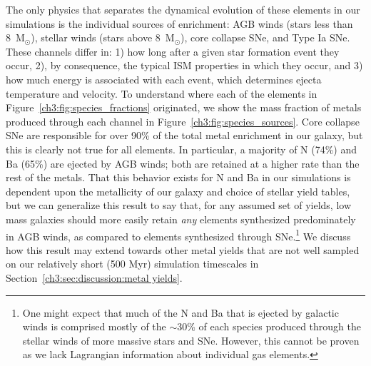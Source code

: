 The only physics that separates the dynamical evolution of these elements in our simulations is the individual sources of enrichment: AGB winds (stars less than 8~M$_{\odot}$), stellar winds (stars above 8~M$_{\odot}$), core collapse SNe, and Type Ia SNe. These channels differ in: 1) how long after a given star formation event they occur, 2), by consequence, the typical ISM properties in which they occur, and 3) how much energy is associated with each event, which determines ejecta temperature and velocity. To understand where each of the elements in Figure~\ref{ch3:fig:species_fractions} originated, we show the mass fraction of metals produced through each channel in Figure~\ref{ch3:fig:species_sources}. Core collapse SNe are responsible for over 90\% of the total metal enrichment in our galaxy, but this is clearly not true for all elements. In particular, a majority of N (74\%) and Ba (65\%) are ejected by AGB winds; both are retained at a higher rate than the rest of the metals. That this behavior exists for N and Ba in our simulations is dependent upon the metallicity of our galaxy and choice of stellar yield tables, but we can generalize this result to say that, for any assumed set of yields, low mass galaxies should more easily retain \textit{any} elements synthesized predominately in AGB winds, as compared to elements synthesized through SNe.\footnote{One might expect that much of the N and Ba that is ejected by galactic winds is comprised mostly of the $\sim$30\% of each species produced through the stellar winds of more massive stars and SNe. However, this cannot be proven as we lack Lagrangian information about individual gas elements.}
We discuss how this result may extend towards other metal yields that are not well sampled on our relatively short (500 Myr) simulation timescales in Section~\ref{ch3:sec:discussion:metal yields}.


